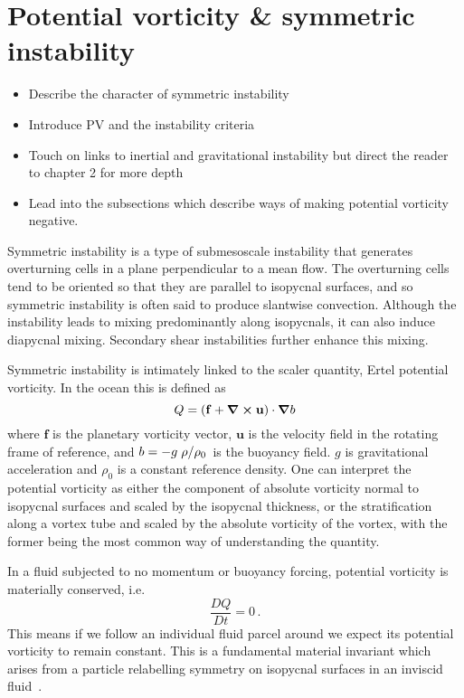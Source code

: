 \section{Potential vorticity \& symmetric instability}
\begin{itemize}
    \item Describe the character of symmetric instability
    \item Introduce PV and the instability criteria
    \item Touch on links to inertial and gravitational instability but direct the reader to chapter 2 for more depth
    \item Lead into the subsections which describe ways of making potential vorticity negative.
\end{itemize}

Symmetric instability is a type of submesoscale instability that generates overturning cells in a plane perpendicular to a mean flow. The overturning cells tend to be oriented so that they are parallel to isopycnal surfaces, and so symmetric instability is often said to produce slantwise convection. Although the instability leads to mixing predominantly along isopycnals, it can also induce diapycnal mixing. Secondary shear instabilities further enhance this mixing.

Symmetric instability is intimately linked to the scaler quantity, Ertel potential vorticity. In the ocean this is defined as
\begin{equation}
    \label{eq:PVDefinition}
    Q = (\mathbf{f} + \curl{\mathbf{u}})\cdot\grad b    
\end{equation}
where $\mathbf{f}$ is the planetary vorticity vector, $\mathbf{u}$ is the velocity field in the rotating frame of reference, and $b = -  g \flatfrac{\rho}{\rho_0}$ is the buoyancy field. $g$ is gravitational acceleration and $\rho_0$ is a constant reference density. One can interpret the potential vorticity as either the component of absolute vorticity normal to isopycnal surfaces and scaled by the isopycnal thickness, or the stratification along a vortex tube and scaled by the absolute vorticity of the vortex, with the former being the most common way of understanding the quantity.

In a fluid subjected to no momentum or buoyancy forcing, potential vorticity is materially conserved, i.e.
\begin{equation}
    \frac{DQ}{Dt} = 0 \, .
\end{equation}
This means if we follow an individual fluid parcel around we expect its potential vorticity to remain constant. This is a fundamental material invariant which arises from a particle relabelling symmetry on isopycnal surfaces in an inviscid fluid~\citep{Salmon1998}.

